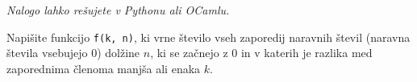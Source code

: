 \documentclass[arhiv]{../izpit}
\begin{document}
  \naloga
  
  \emph{Nalogo lahko rešujete v Pythonu ali OCamlu.}

  \vspace{3mm}
  \noindent
  Napišite funkcijo \verb|f(k, n)|, ki vrne število vseh zaporedij naravnih števil (naravna števila vsebujejo 0) dolžine $n$, ki se začnejo z 0 in v katerih je razlika med zaporednima členoma manjša ali enaka $k$.
  
	
\end{document}
